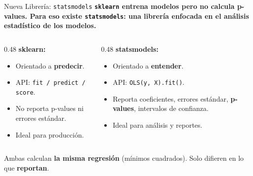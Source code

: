 \documentclass[aspectratio=169, 11pt]{beamer}
\begin{document}
\begin{frame}[shrink=5]{Nueva Librería: \texttt{statsmodels}}
  \vspace{-4pt}
  {\footnotesize\color{arcaDark}\bfseries
    \texttt{sklearn} entrena modelos pero no calcula p-values.
    Para eso existe \texttt{statsmodels}: una librería enfocada
    en el \textbf{análisis estadístico} de los modelos.}

  \vspace{6pt}
  \begin{columns}[T]
    \begin{column}{0.48\textwidth}
      {\footnotesize\bfseries\color{codeBlue}\faCogs\hspace{4pt}
        sklearn:}
      \vspace{4pt}

      {\scriptsize
      \begin{itemize}\setlength{\itemsep}{4pt}
        \item Orientado a \textbf{predecir}.
        \item API: \texttt{fit / predict / score}.
        \item No reporta p-values ni errores estándar.
        \item Ideal para producción.
      \end{itemize}
      }
    \end{column}

    \begin{column}{0.48\textwidth}
      {\footnotesize\bfseries\color{codePurple}\faChartBar\hspace{4pt}
        statsmodels:}
      \vspace{4pt}

      {\scriptsize
      \begin{itemize}\setlength{\itemsep}{4pt}
        \item Orientado a \textbf{entender}.
        \item API: \texttt{OLS(y, X).fit()}.
        \item Reporta coeficientes, errores estándar,
          \textbf{p-values}, intervalos de confianza.
        \item Ideal para análisis y reportes.
      \end{itemize}
      }
    \end{column}
  \end{columns}

  \vspace{6pt}
  {\footnotesize\color{arcaDark}
    \faLightbulb\hspace{4pt}
    Ambas calculan \textbf{la misma regresión} (mínimos cuadrados).
    Solo difieren en lo que \textbf{reportan}.}
\end{frame}
\end{document}
